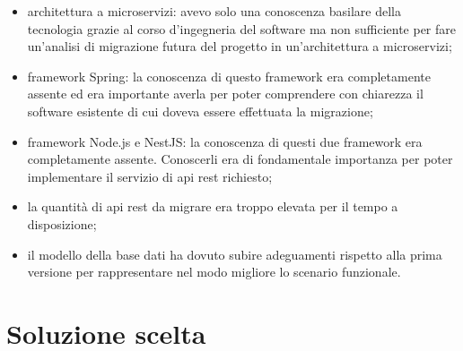 \begin{itemize}
    \item architettura a microservizi: avevo solo una conoscenza basilare
          della tecnologia grazie al corso d'ingegneria del software ma non
          sufficiente per fare un'analisi di migrazione futura del progetto in un'architettura a microservizi;
    \item framework Spring: la conoscenza di questo framework era completamente assente
        ed era importante averla per poter comprendere con chiarezza il software esistente
        di cui doveva essere effettuata la migrazione;
    \item framework Node.js e NestJS: la conoscenza di questi due framework era completamente
        assente. Conoscerli era di fondamentale importanza per poter implementare il servizio
        di \gls{api} \gls{rest} richiesto;
    \item la quantità di \gls{api} \gls{rest} da migrare era troppo elevata per il tempo a disposizione;
    \item il modello della base dati ha dovuto subire adeguamenti rispetto alla prima versione
        per rappresentare nel modo migliore lo scenario funzionale.
\end{itemize}

\section{Soluzione scelta}

